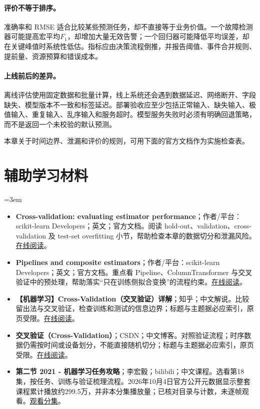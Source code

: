 \paragraph{评价不等于排序。}
准确率和 RMSE 适合比较某些预测任务，却不直接等于业务价值。一个故障检测器可能提高宏平均$F_1$，却增加大量无效告警；一个回归器可能降低平均误差，却在关键峰值时系统性低估。指标应由决策流程倒推，并报告阈值、事件合并规则、提前量、资源预算和错误成本。

\paragraph{上线前后的差异。}
离线评估使用固定数据和批量计算，线上系统还会遇到数据延迟、网络断开、字段缺失、模型版本不一致和标签延迟。部署验收应至少包括正常输入、缺失输入、极值输入、重复输入、乱序输入和服务超时。模型服务失败时必须有明确回退策略，而不是返回一个未校验的默认预测。

本章关于时间边界、泄漏和评价的规则，可用下面的官方文档作为实施检查表。
\section*{辅助学习材料}
\begingroup
\emergencystretch=3em
\begin{itemize}
\item \textbf{Cross-validation: evaluating estimator performance}；作者/平台：scikit-learn Developers；英文；官方文档。阅读 hold-out、validation、cross-validation 及 test-set overfitting 小节，帮助检查本章的数据切分和泄漏风险。\href{https://scikit-learn.org/stable/modules/cross\_validation.html}{在线阅读}。
\item \textbf{Pipelines and composite estimators}；作者/平台：scikit-learn Developers；英文；官方文档。重点看 Pipeline、ColumnTransformer 与交叉验证中的预处理，帮助落实“只在训练侧拟合变换”的流程约束。\href{https://scikit-learn.org/stable/modules/compose.html}{在线阅读}。
\item \textbf{【机器学习】Cross-Validation（交叉验证）详解}；知乎；中文解说。比较留出法与交叉验证，检查训练和测试的信息边界；标题与主题据必应索引，原页受限。\href{https://zhuanlan.zhihu.com/p/24825503}{在线阅读}。
\item \textbf{交叉验证（Cross-Validation）}；CSDN；中文博客。对照验证流程；时序数据仍需按时间或设备划分，不能直接随机切分；标题与主题据必应索引，原页受限。\href{https://blog.csdn.net/weixin\_42691585/article/details/113971857}{在线阅读}。
\item \textbf{第二节 2021 - 机器学习任务攻略}；李宏毅；bilibili；中文课程。选看第18集，按任务、训练与验证梳理流程。2026年10月4日官方公开元数据显示整套课程累计播放约299.5万，并非本分集播放量；已核对目录与计数，未逐帧观看。\href{https://www.bilibili.com/video/BV1Wv411h7kN/?p=18}{观看分集}。
\end{itemize}
\endgroup
